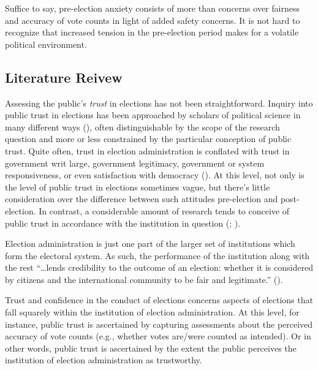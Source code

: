 \documentclass[
  11pt,
  a4paper,
]{scrartcl}
\begin{document}
Suffice to say, pre-election anxiety consists of more than concerns over
fairness and accuracy of vote counts in light of added safety concerns.
It is not hard to recognize that increased tension in the pre-election
period makes for a volatile political environment.

\subsection{Literature Reivew}\label{literature-reivew}

Assessing the public's \emph{trust} in elections has not been
straightforward. Inquiry into public trust in elections has been
approached by scholars of political science in many different ways
(), often distinguishable
by the scope of the research question and more or less constrained by
the particular conception of public trust. Quite often, trust in
election administration is conflated with trust in government writ
large, government legitimacy, government or system responsiveness, or
even satisfaction with democracy (). At this level, not only is the level of public trust in
elections sometimes vague, but there's little consideration over the
difference between such attitudes pre-election and post-election. In
contrast, a considerable amount of research tends to conceive of public
trust in accordance with the institution in question
(;
).

Election administration is just one part of the larger set of
institutions which form the electoral system. As such, the performance
of the institution along with the rest ``\ldots lends credibility to the
outcome of an election: whether it is considered by citizens and the
international community to be fair and legitimate.''
().

Trust and confidence in the conduct of elections concerns aspects of
elections that fall squarely within the institution of election
administration. At this level, for instance, public trust is ascertained
by capturing assessments about the perceived accuracy of vote counts
(e.g., whether votes are/were counted as intended). Or in other words,
public trust is ascertained by the extent the public perceives the
institution of election administration as trustworthy.
\end{document}

